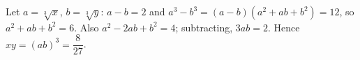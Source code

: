 Let $a=\sqrt[3]x$, $b=\sqrt[3]y$: $a-b=2$ and $a^3-b^3=(a-b)(a^2+ab+b^2)=12$, so $a^2+ab+b^2=6$. Also $a^2-2ab+b^2=4$; subtracting, $3ab=2$. Hence $xy=(ab)^3=\boxed{\dfrac8{27}}$.
